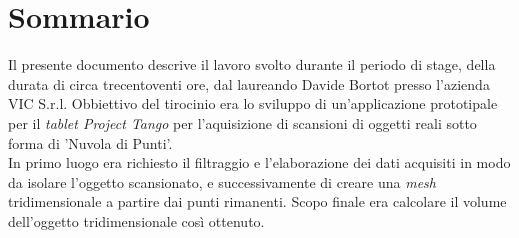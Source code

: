 
\cleardoublepage
{}
{}
\begingroup
\let\clearpage\relax
\let\cleardoublepage\relax
\let\cleardoublepage\relax

\chapter*{Sommario}

Il presente documento descrive il lavoro svolto durante il periodo di stage, della durata di circa trecentoventi ore, dal laureando Davide Bortot presso l'azienda VIC S.r.l.
Obbiettivo del tirocinio era lo sviluppo di un'applicazione prototipale per il \emph{tablet Project Tango} per l'aquisizione di scansioni di oggetti reali sotto forma di 'Nuvola di Punti'. \\
In primo luogo era richiesto il filtraggio e l'elaborazione dei dati acquisiti in modo da isolare l'oggetto scansionato, e successivamente di creare una \emph{mesh} tridimensionale a partire dai punti rimanenti. Scopo finale era calcolare il volume dell'oggetto tridimensionale così ottenuto.

%
%

\endgroup			

\vfill

